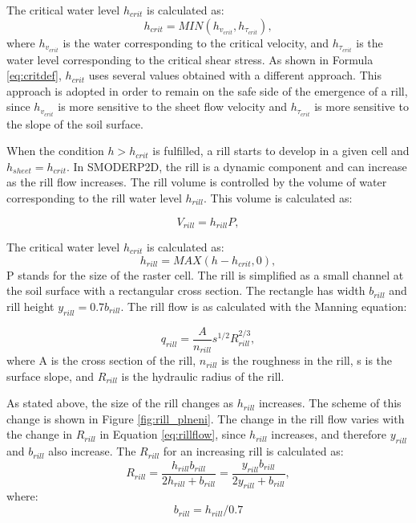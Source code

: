 The critical water level $h_{crit}$ is calculated as:
\begin{equation}
  h_{crit} = MIN(h_{v_{crit}},h_{\tau_{crit}}),
  \label{eq:critdef}
\end{equation}
where $h_{v_{crit}}$ is the water corresponding to the critical velocity, and
$h_{\tau_{crit}}$ is the water level corresponding to the critical shear
stress.  As shown in Formula \ref{eq:critdef}, $h_{crit}$ uses several values
obtained with a different approach. This approach is adopted in order to remain
on the safe side of the emergence of a rill, since $h_{v_{crit}}$ is more
sensitive to the sheet flow velocity and $h_{\tau_{crit}}$ is more sensitive to
the slope of the soil surface. 

When the condition $h>h_{crit}$ is fulfilled, a rill starts to develop in a
given cell and $h_{sheet}=h_{crit}$. In SMODERP2D, the rill is a dynamic component and
can increase as the rill flow increases. The rill volume is controlled by the
volume of water corresponding to the rill water level $h_{rill}$. This volume is
calculated as:


\begin{equation}
  V_{rill} = h_{rill}P,
  \label{eq:rillvol}
\end{equation}

The critical water level $h_{crit}$ is calculated as:
\begin{equation}
  h_{rill} = MAX(h-h_{crit},0),
  \label{eq:hrill}
\end{equation}
P stands for the size of the raster cell. The rill is simplified as a small
channel at the soil surface with a rectangular cross section. The rectangle has
width $b_{rill}$ and rill height $y_{rill} = 0.7b_{rill}$. The rill flow is as
calculated with the Manning equation: 

\begin{equation}
    q_{rill} = \frac{A}{n_{rill}} s^{1/2} R_{rill}^{2/3},
  \label{eq:rillflow}
\end{equation}
where A is the cross section of the rill,  $n_{rill}$ is the roughness in the
rill, s is the surface slope, and  $R_{rill}$  is the hydraulic radius of the
rill. 

As stated above, the size of the rill changes as $h_{rill}$ increases. The
scheme of this change is shown in Figure \ref{fig:rill_plneni}. The change in
the rill flow varies with the change in $R_{rill}$ in Equation
\ref{eq:rillflow}, since $h_{rill}$ increases, and therefore $y_{rill}$ and
$b_{rill}$ also increase. The $R_{rill}$ for an increasing rill is calculated
as:
\begin{equation}
    R_{rill} = \frac{h_{rill}b_{rill}}{2h_{rill}+b_{rill}}  =
    \frac{y_{rill}b_{rill}}{2y_{rill}+b_{rill}},
  \label{eq:rrill}
\end{equation}
where:
\begin{equation}
  b_{rill} = h_{rill}/0.7
  \label{eq:brill}
\end{equation}


